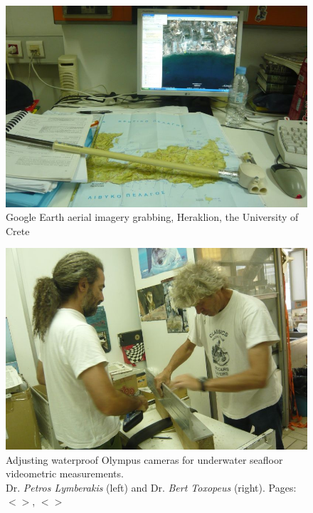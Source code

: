 \documentclass[11pt]{article}
\begin{document}
\begin{appendices}
\begin{figure}[H]
	\centering
	\includegraphics[scale=0.4]{photo-1.jpg}
	\caption{Google Earth aerial imagery grabbing, Heraklion, the University of Crete}
	\label{fig:A.50}
\end{figure}
\begin{figure}[H]
	\centering
	\includegraphics[scale=0.4]{photo-2.jpg}
	\caption{Adjusting waterproof Olympus cameras for underwater seafloor videometric measurements.\\Dr. \textit{Petros Lymberakis} (left) and Dr. \textit{Bert Toxopeus} (right). Pages: $<$\pageref{page-25}$>$, $<$\pageref{page-27}$>$}
	\label{fig:A.51}
\end{figure}


\end{appendices}
\end{document}
